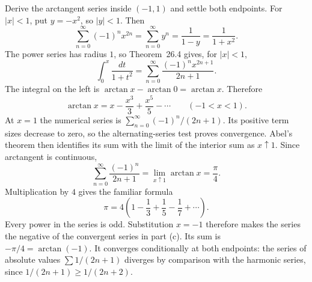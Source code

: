 \goal Derive the arctangent series inside $(-1,1)$ and settle both endpoints.
For $|x|<1$, put $y=-x^2$, so $|y|<1$. Then
\[
 \sum_{n=0}^\infty(-1)^n x^{2n}
 =\sum_{n=0}^\infty y^n=\frac1{1-y}=\frac1{1+x^2}.
\]
The power series has radius $1$, so Theorem~26.4 gives, for $|x|<1$,
\[
 \int_0^x\frac{dt}{1+t^2}
 =\sum_{n=0}^\infty\frac{(-1)^n x^{2n+1}}{2n+1}.
\]
The integral on the left is $\arctan x-\arctan0=\arctan x$. Therefore
\[
 \arctan x=x-\frac{x^3}{3}+\frac{x^5}{5}-\cdots
 \qquad(-1<x<1).
\]
At $x=1$ the numerical series is
$\sum_{n=0}^\infty(-1)^n/(2n+1)$. Its positive term sizes decrease to zero,
so the alternating-series test proves convergence.
Abel's theorem then identifies its sum with the limit of the interior sum
as $x\uparrow1$. Since arctangent is continuous,
\[
 \sum_{n=0}^\infty\frac{(-1)^n}{2n+1}
 =\lim_{x\uparrow1}\arctan x=\frac\pi4.
\]
Multiplication by $4$ gives the familiar formula
\[
 \boxed{\pi=4\left(1-\frac13+\frac15-\frac17+\cdots\right)}.
\]
Every power in the series is odd. Substitution $x=-1$ therefore makes the
series the negative of the convergent series in part (c). Its sum is
$-\pi/4=\arctan(-1)$. It converges conditionally at both endpoints: the
series of absolute values $\sum1/(2n+1)$ diverges by comparison with the
harmonic series, since $1/(2n+1)\ge1/(2n+2)$.
